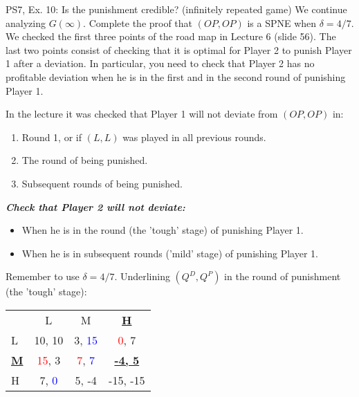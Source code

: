 \begin{frame}{PS7, Ex. 10: Is the punishment credible? (infinitely repeated game)}
    We continue analyzing $G(\infty)$. Complete the proof that $(OP,OP)$ is a SPNE when $\delta=4/7$. We checked the first three points of the road map in Lecture 6 (slide 56). The last two points consist of checking that it is optimal for Player 2 to punish Player 1 after a deviation. In particular, you need to check that Player 2 has no profitable deviation when he is in the first and in the second round of punishing Player 1.
    \begin{multicols}{2}
      In the lecture it was checked that Player 1 will not deviate from $(OP,OP)$ in:
      \begin{enumerate}
        \item Round 1, or if $(L,L)$ was played in all previous rounds.
        \item The  round of being punished.
        \item Subsequent rounds of being punished.
      \end{enumerate}
      \textbf{\textit{Check that Player 2 will not deviate:}}
      \begin{itemize}
        \item[4.] When he is in the  round (the 'tough' stage) of punishing Player 1.
        \item[5.] When he is in subsequent rounds ('mild' stage) of punishing Player 1.
      \end{itemize}
      Remember to use $\delta=4/7$.
      \vfill\null\columnbreak
      Underlining $(Q^D,Q^P)$ in the  round of punishment (the 'tough' stage):
      \vspace{-6pt}
      \begin{table}
        \begin{tabular}{l|c|c|c|}
          \multicolumn{1}{c}{} & \multicolumn{1}{c}{L} & \multicolumn{1}{c}{M} & \multicolumn{1}{c}{\textbf{\underline{H}}} \\\cline{2-4}
          L & 10, 10 & 3, \textcolor{blue}{15} & \textcolor{red}{0}, 7 \\\cline{2-4}
          \textbf{\underline{M}} & \textcolor{red}{15}, 3 & \textcolor{red}{7}, \textcolor{blue}{7} & \textbf{\underline{-4, 5}} \\\cline{2-4}
          H & 7, \textcolor{blue}{0} & 5, -4 & -15, -15 \\\cline{2-4}
        \end{tabular}
      \end{table}

\end{multicols}
\end{frame}
